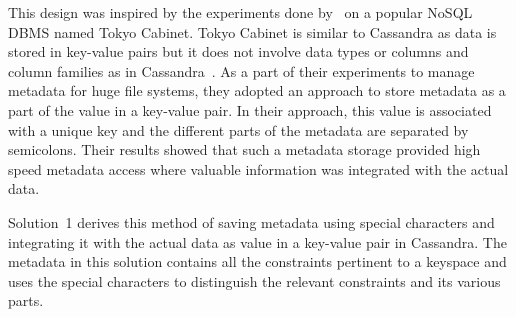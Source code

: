 This design was inspired by the experiments done by~\citet{Hackl} on a popular
\ac{NoSQL} \ac{DBMS} named Tokyo Cabinet.  Tokyo Cabinet is similar to Cassandra
as data is stored in key-value pairs but it does not involve data types or
columns and column families as in Cassandra~\citep{Hackl,tokyo}.
As a part of their experiments to manage metadata for huge file systems,  they
adopted an approach to store metadata  as a part of the value in a key-value
pair.  In their approach, this value  is associated with a
unique key and the different parts of the metadata are separated by semicolons.
Their results showed that such a metadata storage provided high speed metadata
access where valuable information was integrated with the actual data.

Solution~1 derives this method of saving
metadata using special characters and integrating it with the actual data as
value in a key-value pair in Cassandra.  The metadata in this solution 
contains all the constraints pertinent to a keyspace and uses
the special characters to distinguish the relevant constraints and its various
parts.













